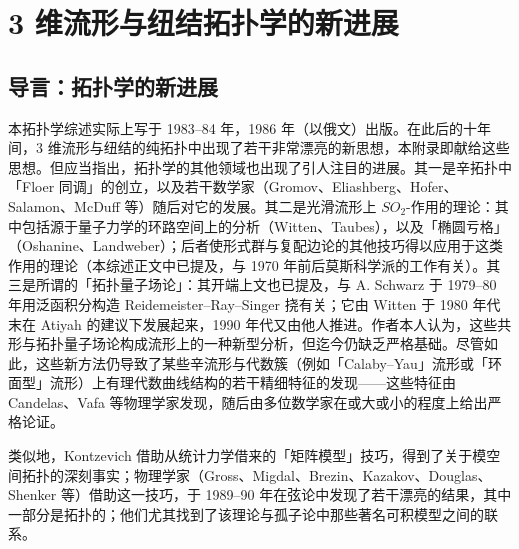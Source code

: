 
\chapter{3 维流形与纽结拓扑学的新进展}

\section{导言：拓扑学的新进展}


本拓扑学综述实际上写于 1983--84 年，1986 年（以俄文）出版。在此后的十年间，3 维流形与纽结的纯拓扑中出现了若干非常漂亮的新思想，本附录即献给这些思想。但应当指出，拓扑学的其他领域也出现了引人注目的进展。其一是辛拓扑中「Floer 同调」的创立，以及若干数学家（Gromov、Eliashberg、Hofer、Salamon、McDuff 等）随后对它的发展。其二是光滑流形上 $SO_2$-作用的理论：其中包括源于量子力学的环路空间上的分析（Witten、Taubes），以及「椭圆亏格」（Oshanine、Landweber）；后者使形式群与复配边论的其他技巧得以应用于这类作用的理论（本综述正文中已提及，与 1970 年前后莫斯科学派的工作有关）。其三是所谓的「拓扑量子场论」：其开端上文也已提及，与 A. Schwarz 于 1979--80 年用泛函积分构造 Reidemeister--Ray--Singer 挠有关；它由 Witten 于 1980 年代末在 Atiyah 的建议下发展起来，1990 年代又由他人推进。作者本人认为，这些共形与拓扑量子场论构成流形上的一种新型分析，但迄今仍缺乏严格基础。尽管如此，这些新方法仍导致了某些辛流形与代数簇（例如「Calaby--Yau」流形或「环面型」流形）上有理代数曲线结构的若干精细特征的发现——这些特征由 Candelas、Vafa 等物理学家发现，随后由多位数学家在或大或小的程度上给出严格论证。


类似地，Kontzevich 借助从统计力学借来的「矩阵模型」技巧，得到了关于模空间拓扑的深刻事实；物理学家（Gross、Migdal、Brezin、Kazakov、Douglas、Shenker 等）借助这一技巧，于 1989--90 年在弦论中发现了若干漂亮的结果，其中一部分是拓扑的；他们尤其找到了该理论与孤子论中那些著名可积模型之间的联系。

